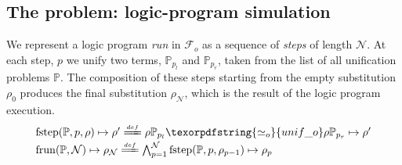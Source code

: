 \documentclass[sigconf,natbib=false,review]{acmart}
\newcommand{\UnifRel}{\ensuremath{\simeq}}
\newcommand{\Uo}{\texorpdfstring{\ensuremath{\UnifRel_o}\xspace}{unif\_o}}
\newcommand{\Ue}{\ensuremath{\UnifRel_\lambda}\xspace}
\newcommand{\Fo}{\texorpdfstring{\ensuremath{\mathcal{F}_{\!o}\xspace}}{Fo}} %
\newcommand{\foUnifPb}{\ensuremath{\mathbb{P}}\xspace}
\begin{document}
\subsection{The problem: logic-program simulation}
We represent a logic program \emph{run} in \Fo{} as
a sequence of \emph{steps} of length $\mathcal{N}$.
At each step, $p$ we unify two terms, $\foUnifPb_{p_l}$ and
$\foUnifPb_{p_r}$, taken from the list of all unification
problems \foUnifPb.
The composition of these steps starting from the
empty substitution $\rho_0$ produces the final
substitution $\rho_\mathcal{N}$, which is the result of the
logic program execution.
%
\newcommand{\C}[4]{\ensuremath{\langle #1 \rangle}\mapsto(#2,#3,#4)}
\newcommand{\D}[4]{\ensuremath{\langle #1,#2,#3 \rangle^{-1}\mapsto #4}}
\newcommand{\progress}{\ensuremath{\mathrm{progress}}\xspace}
\newcommand{\fstep}{\ensuremath{\mathrm{fstep}}\xspace}
\newcommand{\hstep}{\ensuremath{\mathrm{hstep}}\xspace}
\newcommand{\frun}{\ensuremath{\mathrm{frun}}\xspace}
\newcommand{\hrun}{\ensuremath{\mathrm{hrun}}\xspace}
\newcommand{\stepF}[4]{\ensuremath{\fstep(#1,#2,#3) \mapsto #4}}
\newcommand{\stepFD}[4]{%
\ensuremath{#3 #1_{#2_l} \Uo #3 #1_{#2_r} \mapsto #4}}
\newcommand{\stepH}[6]{\ensuremath{\hstep(#1,#2,#3,#4) \mapsto (#5, #6)}}
\newcommand{\stepHD}[6]{\ensuremath{%
#3 #1_{#2_l} \Ue #3 #1_{#2_r} \mapsto #4 \land \progress(#6,#4) \mapsto (#6',#5)}}
\newcommand{\runF}[3]{\ensuremath{\frun(#1,#2) \mapsto #3_{#2}}}
\newcommand{\runFD}[2]{\ensuremath{%
\bigwedge_{p = 1}^{#2} \stepF{#1}{p}{\rho_{p-1}}{\rho_{p}}}}
\newcommand{\runH}[3]{\ensuremath{\hrun(#1,#2) \mapsto #3_{#2}}}
\newcommand{\runHD}[3]{\ensuremath{%
\bigwedge_{p = 1}^{#2} \stepH{#1}{p}{\sigma_{p-1}}{#3_{p-1}}{\sigma_{p}}{#3_p}}}
\newcommand{\deff}{\ensuremath{\stackrel{{\scriptscriptstyle def}}{=\!=\!\!\!=}}}
%
$$
\begin{array}{l}
\stepF{\foUnifPb}{p}{\rho}{\rho'}
\deff
\stepFD{\foUnifPb}{p}{\rho}{\rho'}\vspace{2pt}\\
\runF{\foUnifPb}{\mathcal{N}}{\rho}
\deff
\runFD{\foUnifPb}{\mathcal{N}}
\end{array}
$$
\end{document}
